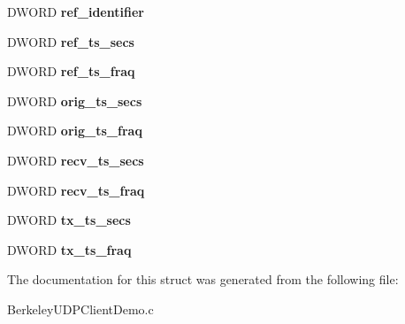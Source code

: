 \begin{DoxyCompactItemize}
\item 
\hypertarget{struct_n_t_p___p_a_c_k_e_t_a813083606a438096a27b6c74bfe08992}{D\-W\-O\-R\-D {\bfseries ref\-\_\-identifier}}\label{struct_n_t_p___p_a_c_k_e_t_a813083606a438096a27b6c74bfe08992}

\item 
\hypertarget{struct_n_t_p___p_a_c_k_e_t_a9228ab9cc26501110f5176fc40d12ebc}{D\-W\-O\-R\-D {\bfseries ref\-\_\-ts\-\_\-secs}}\label{struct_n_t_p___p_a_c_k_e_t_a9228ab9cc26501110f5176fc40d12ebc}

\item 
\hypertarget{struct_n_t_p___p_a_c_k_e_t_a975979c83ef86b18eebff67dd396121a}{D\-W\-O\-R\-D {\bfseries ref\-\_\-ts\-\_\-fraq}}\label{struct_n_t_p___p_a_c_k_e_t_a975979c83ef86b18eebff67dd396121a}

\item 
\hypertarget{struct_n_t_p___p_a_c_k_e_t_a47b1c85ee3a93eef43e8ecfd2be194b2}{D\-W\-O\-R\-D {\bfseries orig\-\_\-ts\-\_\-secs}}\label{struct_n_t_p___p_a_c_k_e_t_a47b1c85ee3a93eef43e8ecfd2be194b2}

\item 
\hypertarget{struct_n_t_p___p_a_c_k_e_t_ad9a5900909f5a8dbdbb4c9642b11d02c}{D\-W\-O\-R\-D {\bfseries orig\-\_\-ts\-\_\-fraq}}\label{struct_n_t_p___p_a_c_k_e_t_ad9a5900909f5a8dbdbb4c9642b11d02c}

\item 
\hypertarget{struct_n_t_p___p_a_c_k_e_t_a7a2fbc040bbdcff75319b9425880c2bb}{D\-W\-O\-R\-D {\bfseries recv\-\_\-ts\-\_\-secs}}\label{struct_n_t_p___p_a_c_k_e_t_a7a2fbc040bbdcff75319b9425880c2bb}

\item 
\hypertarget{struct_n_t_p___p_a_c_k_e_t_a6b468c9554bae642f888b53a0ba7fe98}{D\-W\-O\-R\-D {\bfseries recv\-\_\-ts\-\_\-fraq}}\label{struct_n_t_p___p_a_c_k_e_t_a6b468c9554bae642f888b53a0ba7fe98}

\item 
\hypertarget{struct_n_t_p___p_a_c_k_e_t_a2e212a23ca9b57d2942bb2b17bb9e63e}{D\-W\-O\-R\-D {\bfseries tx\-\_\-ts\-\_\-secs}}\label{struct_n_t_p___p_a_c_k_e_t_a2e212a23ca9b57d2942bb2b17bb9e63e}

\item 
\hypertarget{struct_n_t_p___p_a_c_k_e_t_aea70377c119a15e9bfd2d51d43e223c4}{D\-W\-O\-R\-D {\bfseries tx\-\_\-ts\-\_\-fraq}}\label{struct_n_t_p___p_a_c_k_e_t_aea70377c119a15e9bfd2d51d43e223c4}

\end{DoxyCompactItemize}


The documentation for this struct was generated from the following file\-:\begin{DoxyCompactItemize}
\item 
Berkeley\-U\-D\-P\-Client\-Demo.\-c\end{DoxyCompactItemize}
